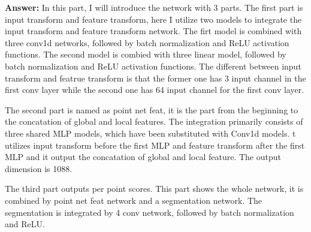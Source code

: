 \documentclass[11pt]{article}
\begin{document}
\textbf{Answer:} In this part, I will introduce the network with 3 parts. The first part is input transform and feature transform, here I utilize two models to integrate the input transform and feature transform network. 
The firt model is combined with three conv1d networks, followed by batch normalization and ReLU activation functions. The second model is combied with three linear model, followed by batch normalization and ReLU activation functions.
The different between input transform and featrue transform is that the former one has 3 input channel in the first conv layer while the second one has 64 input channel for the first conv layer.

The second part is named as point net feat, it is the part from the beginning to the concatation of global and local features. The integration primarily consists of three shared MLP models, which have been substituted with Conv1d models. t utilizes input transform before the first MLP and feature transform after the first MLP and it output the concatation of global and local feature. The output dimension is 1088.

The third part outputs per point scores. This part shows the whole network, it is combined by point net feat network and a segmentation network. The segmentation is integrated by 4 conv network, followed by batch normalization and ReLU.
\end{document}
